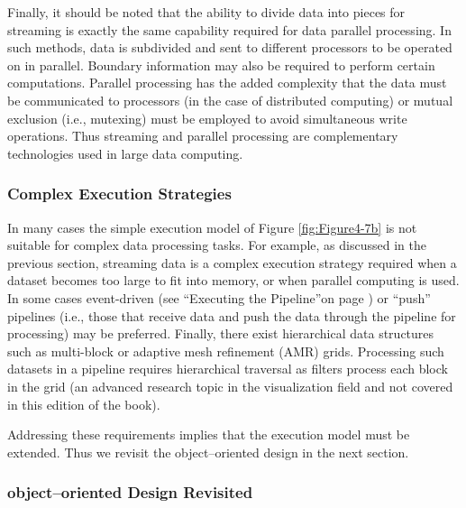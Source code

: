 Finally, it should be noted that the ability to divide data into pieces for streaming is exactly the same capability required for data parallel processing. In such methods, data is subdivided and sent to different processors to be operated on in parallel. Boundary information may also be required to perform certain computations. Parallel processing has the added complexity that the data must be communicated to processors (in the case of distributed computing) or mutual exclusion (i.e., mutexing) must be employed to avoid simultaneous write operations. Thus streaming and parallel processing are complementary technologies used in large data computing.

\subsubsection{Complex Execution Strategies}
\label{subsubsec:complex_execution_strategies}

In many cases the simple execution model of Figure \ref{fig:Figure4-7b} is not suitable for complex data processing tasks. For example, as discussed in the previous section, streaming data is a complex execution strategy required when a dataset becomes too large to fit into memory, or when parallel computing is used. In some cases event-driven (see ``Executing the Pipeline''on page \pageref{sec:executing_pipeline}) or ``push'' pipelines (i.e., those that receive data and push the data through the pipeline for processing) may be preferred. Finally, there exist hierarchical data structures such as multi-block or adaptive mesh refinement (AMR) \cite{Berger84} grids. Processing such datasets in a pipeline requires hierarchical traversal as filters process each block in the grid (an advanced research topic in the visualization field and not covered in this edition of the book).

Addressing these requirements implies that the execution model must be extended. Thus we revisit the object--oriented design in the next section.

\subsubsection{object--oriented Design Revisited}
\label{subsubsec:object_oriented_design_revisited}

